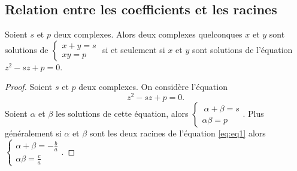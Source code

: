 \subsection{Relation entre les coefficients et les racines}
\label{subsec:relationcoefsracines}
\begin{prop}
    Soient \(s\) et \(p\) deux complexes. Alors deux complexes quelconques \(x\) 
    et \(y\) sont solutions de \(\begin{cases} x +y = s \\ xy=p \end{cases}\) si 
    et seulement si \(x\) et \(y\) sont solutions de l'équation \(z^2 -sz+p=0\).
\end{prop}
\begin{proof}
    Soient \(s\) et \(p\) deux complexes. On considère l'équation
    \begin{equation}
        z^2-sz+p=0.
    \end{equation}
    Soient \(\alpha\) et \(\beta\) les solutions de cette équation, alors
    $\begin{cases} \
        \alpha +\beta = s \\
        \alpha \beta=p
    \end{cases}$.
    Plus généralement si \(\alpha\) et \(\beta\) sont les deux racines de 
    l'équation \eqref{eq:eq1} alors \(\begin{cases} \alpha + \beta = 
    -\frac{b}{a} \\ \alpha \beta = \frac{c}{a} \end{cases}\).
\end{proof}
